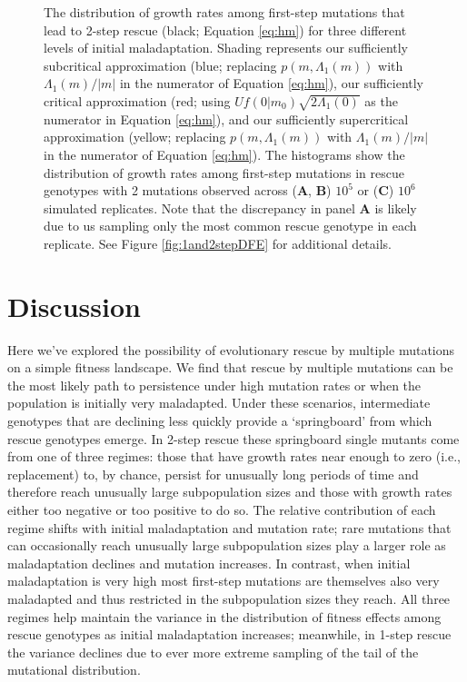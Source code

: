 \documentclass[9pt,twocolumn,twoside,lineno]{gsajnl}
\begin{document}
\begin{figure}[htbp]
\caption{
The distribution of growth rates among first-step mutations that lead to 2-step rescue (black; Equation \ref{eq:hm}) for three different levels of initial maladaptation.
Shading represents our sufficiently subcritical approximation (blue; replacing $p(m,\Lambda_1(m))$ with $\Lambda_1(m)/|m|$ in the numerator of Equation \ref{eq:hm}), our sufficiently critical approximation (red; using $U f(0|m_0) \sqrt{2 \Lambda_1(0)}$ as the numerator in Equation \ref{eq:hm}), and our sufficiently supercritical approximation (yellow; replacing $p(m,\Lambda_1(m))$ with $\Lambda_1(m)/|m|$ in the numerator of Equation \ref{eq:hm}).
The histograms show the distribution of growth rates among first-step mutations in rescue genotypes with 2 mutations observed across (\textbf{A}, \textbf{B}) $10^5$ or (\textbf{C}) $10^6$ simulated replicates.
Note that the discrepancy in panel \textbf{A} is likely due to us sampling only the most common rescue genotype in each replicate.
See Figure \ref{fig:1and2stepDFE} for additional details.
}%
\label{fig:2stepDFE}
\end{figure}

\section{Discussion}
\label{sec:discussion}

Here we've explored the possibility of evolutionary rescue by multiple mutations on a simple fitness landscape. 
We find that rescue by multiple mutations can be the most likely path to persistence under high mutation rates or when the population is initially very maladapted.
Under these scenarios, intermediate genotypes that are declining less quickly provide a `springboard' from which rescue genotypes emerge.
In 2-step rescue these springboard single mutants come from one of three regimes: those that have growth rates near enough to zero (i.e., replacement) to, by chance, persist for unusually long periods of time and therefore reach unusually large subpopulation sizes and those with growth rates either too negative or too positive to do so.
The relative contribution of each regime shifts with initial maladaptation and mutation rate; rare mutations that can occasionally reach unusually large subpopulation sizes play a larger role as maladaptation declines and mutation increases.
In contrast, when initial maladaptation is very high most first-step mutations are themselves also very maladapted and thus restricted in the subpopulation sizes they reach.     
All three regimes help maintain the variance in the distribution of fitness effects among rescue genotypes as initial maladaptation increases; meanwhile, in 1-step rescue the variance declines due to ever more extreme sampling of the tail of the mutational distribution.
\end{document}
